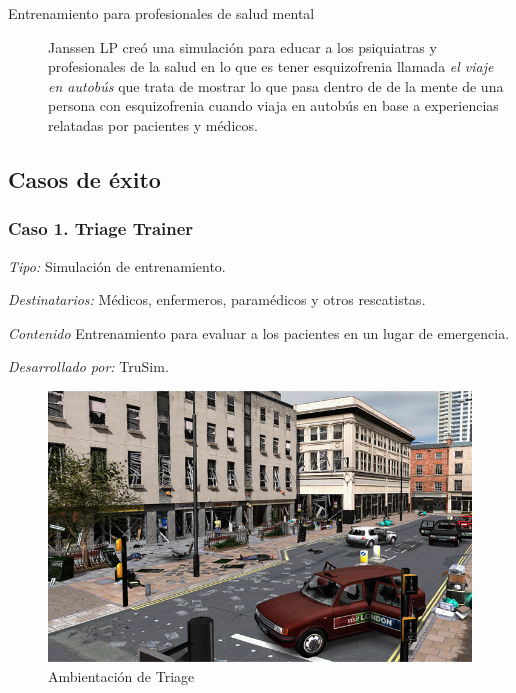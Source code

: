 \begin{description}
\item[Entrenamiento para profesionales de salud mental] Janssen LP creó una
	simulación para educar a los psiquiatras y profesionales de la salud en
	lo que es tener esquizofrenia llamada \emph{el viaje en autobús} que
	trata de mostrar lo que pasa dentro de de la mente de una persona con
	esquizofrenia cuando viaja en autobús en base a experiencias relatadas
	por pacientes y médicos\cite{mantovani:vr}. 

\end{description}

\subsection{Casos de éxito}


\subsubsection{Caso 1. Triage Trainer}
	

\emph{Tipo: } Simulación de entrenamiento.

\emph{Destinatarios: } Médicos, enfermeros, paramédicos y otros rescatistas.

\emph{Contenido} Entrenamiento para evaluar a los pacientes en un lugar de
emergencia.

\emph{Desarrollado por: } TruSim.

\begin{figure}[h!] 
	\centering 
	\includegraphics[scale=0.5]{tics/images/triage.png}
	\caption{Ambientación de Triage}
	\label{fig:triage}
\end{figure}


